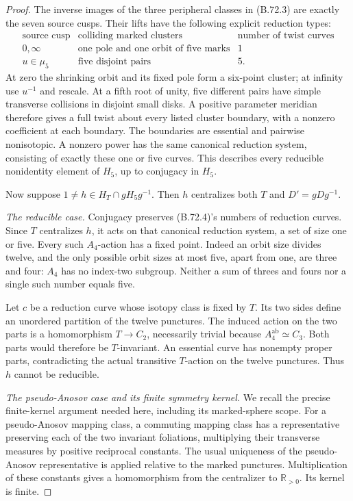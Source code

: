 \begin{proof}
The inverse images of the three peripheral classes in
(B.72.3) are exactly the seven source cusps.
Their lifts have the following explicit reduction types:
\[
\begin{array}{c|c|c}
\text{source cusp}&\text{colliding marked clusters}
                       &\text{number of twist curves}\\\hline
0,\infty&\text{one pole and one orbit of five marks}&1\\
u\in\mu_5&\text{five disjoint pairs}&5.
\end{array}                                                     \tag{B.72.4}
\]
At zero the shrinking orbit and its fixed pole form a
six-point cluster; at infinity use $u^{-1}$ and rescale.
At a fifth root of unity, five different pairs have
simple transverse collisions in disjoint small disks.
A positive parameter meridian therefore gives a full
twist about every listed cluster boundary, with a
nonzero coefficient at each boundary.
The boundaries are essential and pairwise nonisotopic.
A nonzero power has the same canonical reduction
system, consisting of exactly these one or five curves.
This describes every reducible nonidentity element
of $H_5$, up to conjugacy in $H_5$.

Now suppose $1\ne h\in H_T\cap gH_5g^{-1}$.
Then $h$ centralizes both $T$ and $D'=gDg^{-1}$.

\emph{The reducible case.}
Conjugacy preserves (B.72.4)'s numbers of reduction curves.
Since $T$ centralizes $h$, it acts on that canonical
reduction system, a set of size one or five.
Every such $A_4$-action has a fixed point.
Indeed an orbit size divides twelve, and the only
possible orbit sizes at most five, apart from one,
are three and four: $A_4$ has no index-two subgroup.
Neither a sum of threes and fours nor a single such
number equals five.

Let $c$ be a reduction curve whose isotopy class is
fixed by $T$.  Its two sides define an unordered
partition of the twelve punctures.
The induced action on the two parts is a homomorphism
$T\to C_2$, necessarily trivial because
$A_4^{\mathrm{ab}}\simeq C_3$.
Both parts would therefore be $T$-invariant.
An essential curve has nonempty proper parts,
contradicting the actual transitive $T$-action on
the twelve punctures.  Thus $h$ cannot be reducible.

\emph{The pseudo-Anosov case and its finite symmetry kernel.}
We recall the precise finite-kernel argument needed here,
including its marked-sphere scope.
For a pseudo-Anosov mapping class, a commuting mapping
class has a representative preserving each of the two
invariant foliations, multiplying their transverse
measures by positive reciprocal constants.
The usual uniqueness of the pseudo-Anosov representative
is applied relative to the marked punctures.
Multiplication of these constants gives a homomorphism
from the centralizer to $\mathbb R_{>0}$.
Its kernel is finite.


\end{proof}
